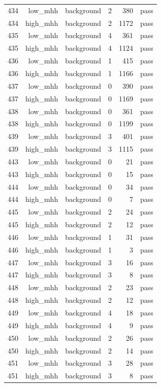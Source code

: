\begin{table}[htbp]
{\begin{tabular}{lrrrrr}
434 & low\_mhh & background & 2 & 380 & pass \\
434 & high\_mhh & background & 2 & 1172 & pass \\
435 & low\_mhh & background & 4 & 361 & pass \\
435 & high\_mhh & background & 4 & 1124 & pass \\
436 & low\_mhh & background & 1 & 415 & pass \\
436 & high\_mhh & background & 1 & 1166 & pass \\
437 & low\_mhh & background & 0 & 390 & pass \\
437 & high\_mhh & background & 0 & 1169 & pass \\
438 & low\_mhh & background & 0 & 361 & pass \\
438 & high\_mhh & background & 0 & 1199 & pass \\
439 & low\_mhh & background & 3 & 401 & pass \\
439 & high\_mhh & background & 3 & 1115 & pass \\
443 & low\_mhh & background & 0 & 21 & pass \\
443 & high\_mhh & background & 0 & 15 & pass \\
444 & low\_mhh & background & 0 & 34 & pass \\
444 & high\_mhh & background & 0 & 7 & pass \\
445 & low\_mhh & background & 2 & 24 & pass \\
445 & high\_mhh & background & 2 & 12 & pass \\
446 & low\_mhh & background & 1 & 31 & pass \\
446 & high\_mhh & background & 1 & 3 & pass \\
447 & low\_mhh & background & 3 & 16 & pass \\
447 & high\_mhh & background & 3 & 8 & pass \\
448 & low\_mhh & background & 2 & 23 & pass \\
448 & high\_mhh & background & 2 & 12 & pass \\
449 & low\_mhh & background & 4 & 18 & pass \\
449 & high\_mhh & background & 4 & 9 & pass \\
450 & low\_mhh & background & 2 & 26 & pass \\
450 & high\_mhh & background & 2 & 14 & pass \\
451 & low\_mhh & background & 3 & 28 & pass \\
451 & high\_mhh & background & 3 & 8 & pass \\

\end{tabular}}
\end{table}
